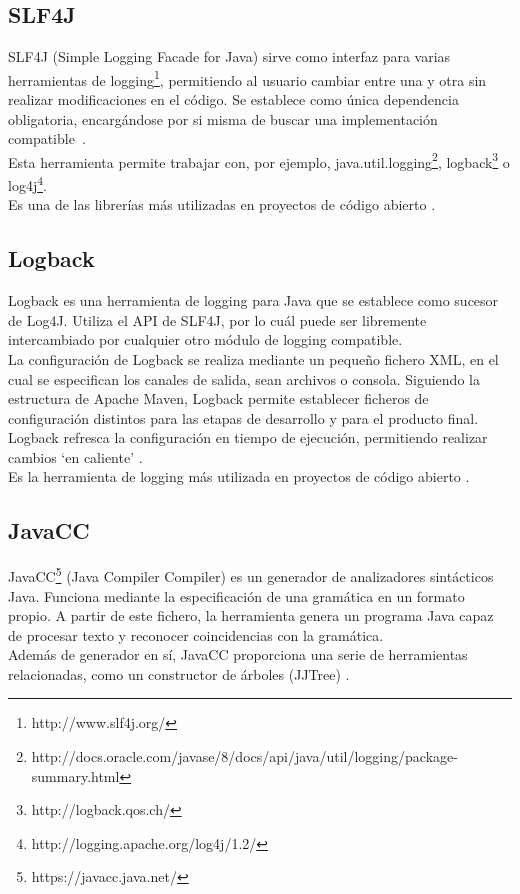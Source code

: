 \subsection{SLF4J}

SLF4J (Simple Logging Facade for Java) sirve como interfaz para varias herramientas de logging\footnote{http://www.slf4j.org/}, permitiendo al usuario cambiar entre una y otra sin realizar modificaciones en el código.
Se establece como única dependencia obligatoria, encargándose por si misma de buscar una implementación compatible~\cite{website:slf4j}.
\\
Esta herramienta permite trabajar con, por ejemplo, java.util.logging\footnote{http://docs.oracle.com/javase/8/docs/api/java/util/logging/package-summary.html}, logback\footnote{http://logback.qos.ch/} o log4j\footnote{http://logging.apache.org/log4j/1.2/}.
\\
Es una de las librerías más utilizadas en proyectos de código abierto \cite{website:githubTOP}.

\subsection{Logback}

Logback es una herramienta de logging para Java que se establece como sucesor de Log4J.
Utiliza el API de SLF4J, por lo cuál puede ser libremente intercambiado por cualquier otro módulo de logging compatible.
\\
La configuración de Logback se realiza mediante un pequeño fichero XML, en el cual se especifican los canales de salida, sean archivos o consola.
Siguiendo la estructura de Apache Maven, Logback permite establecer ficheros de configuración distintos para las etapas de desarrollo y para el producto final.
Logback refresca la configuración en tiempo de ejecución, permitiendo realizar cambios `en caliente' \cite{website:logback}.
\\
Es la herramienta de logging más utilizada en proyectos de código abierto \cite{website:githubTOP}.

\subsection{JavaCC}

JavaCC\footnote{https://javacc.java.net/} (Java Compiler Compiler) es un generador de analizadores sintácticos Java.
Funciona mediante la especificación de una gramática en un formato propio.
A partir de este fichero, la herramienta genera un programa Java capaz de procesar texto y reconocer coincidencias con la gramática.
\\
Además de generador en sí, JavaCC proporciona una serie de herramientas relacionadas, como un constructor de árboles (JJTree) \cite{website:javacc}.

